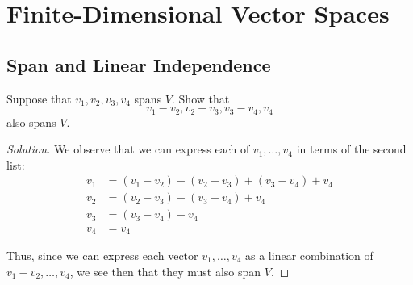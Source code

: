 \documentclass[openany]{book}
\newenvironment{solution}{\begin{proof}[Solution]}{\end{proof}}
\newcommand{\RR}{\mathbb{R}}
\begin{document}
\chapter{Finite-Dimensional Vector Spaces}
\section{Span and Linear Independence}
\begin{hw}
	Suppose that $v_{1}, v_{2}, v_{3}, v_{4}$ spans $V$. Show that
	\begin{equation*}
		v_{1} - v_{2}, v_{2} - v_{3}, v_{3} - v_{4}, v_{4} 
	\end{equation*} 
	also spans $V$.
\end{hw}
\begin{solution}
\begin{comment}
		We observe that since $v_{1}, \ldots, v_{4}$ spans vectors in $v$, then by definition, for all $v \in V$, we can express as a linear combination, where $a_{1}, \ldots, a_{4}$ are some scalar in $\RR$.
	\begin{equation*}
		a_{1}v_{1} + a_{2}v_{2} + a_{3}v_{3} + a_{4}v_{4}.
	\end{equation*}

	From here, we note that
	\begin{align*}
		a_{1}(v_{1} - v_{2}) + a_{2}(v_{2} - v_{3}) + a_{3}(v_{3} - v_{4}) + a_{4}v_{4} &= a_{1}v_{1} -a_{1}v_{2} +a_{2}v_{2} - a_{2}v_{3} + a_{3}v_{3} - a_{3}v_{4} + a_{4}v_{4} \\
		&= a_{1}v_{1} + (a_{2} -a_{1})v_{2} + (a_{3} - a_{2})v_{3} + (a_{4} - a_{3})v_{4}
	\end{align*}
\end{comment}
We observe that we can express each of $v_{1}, \ldots, v_{4}$ in terms of the second list:
\begin{align*}
	v_{1} &= (v_{1} - v_{2}) + (v_{2} - v_{3}) + (v_{3} - v_{4}) + v_{4} \\
	v_{2} &= (v_{2} - v_{3}) + (v_{3} - v_{4}) + v_{4} \\
	v_{3} &= (v_{3} - v_{4}) + v_{4} \\
	v_{4} &= v_{4} 
\end{align*}

Thus, since we can express each vector $v_{1}, \ldots, v_{4}$ as a linear combination of $v_{1} - v_{2}, \ldots, v_{4}$, we see then that they must also span $V$.
\end{solution}
\end{document}
